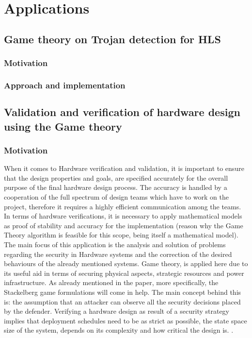 \documentclass[conference]{IEEEtran}
\begin{document}
\section{Applications}
\subsection{Game theory on Trojan detection for HLS}
\subsubsection{Motivation}

\subsubsection{Approach and implementation}
\subsection{Validation and verification of hardware design using the Game theory}
\subsubsection{Motivation}
When it comes to Hardware verification and validation, it is important to ensure that the design properties and goals, are specified accurately for the overall purpose of the final hardware design process. The accuracy is handled by a cooperation of the full spectrum of design teams which have to work on the project, therefore it requires a highly efficient communication among the teams. In terms of hardware verifications, it is necessary to apply mathematical models as proof of stability and accuracy for the implementation (reason why the Game Theory algorithm is feasible for this scope, being itself a mathematical model). The main focus of this application is the analysis and solution of problems regarding the security in Hardware systems and the correction of the desired behaviours of the already mentioned systems.
Game theory, is applied here due to its useful aid in terms of securing physical aspects, strategic resources and power infrastructure. As already mentioned in the paper, more specifically, the Stackelberg game formulations will come in help. The main concept behind this is: the assumption that an attacker can observe all the security decisions placed by the defender. Verifying a hardware design as result of a security strategy implies that deployment schedules need to be as strict as possible, the state space size of the system, depends on its complexity and how critical the design is.
. 
\end{document}
